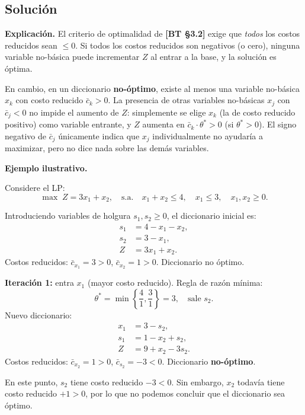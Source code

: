 \documentclass{article}
\begin{document}
\subsection*{Solución}

\textbf{Explicación.}
El criterio de optimalidad de \textbf{[BT §3.2]} exige que \emph{todos} los costos reducidos sean $\leq 0$. Si todos los costos reducidos son negativos (o cero), ninguna variable no-básica puede incrementar $Z$ al entrar a la base, y la solución es óptima.

En cambio, en un diccionario \textbf{no-óptimo}, existe al menos una variable no-básica $x_k$ con costo reducido $\bar{c}_k > 0$. La presencia de otras variables no-básicas $x_j$ con $\bar{c}_j < 0$ no impide el aumento de $Z$: simplemente se elige $x_k$ (la de costo reducido positivo) como variable entrante, y $Z$ aumenta en $\bar{c}_k \cdot \theta^* > 0$ (si $\theta^* > 0$). El signo negativo de $\bar{c}_j$ únicamente indica que $x_j$ individualmente no ayudaría a maximizar, pero no dice nada sobre las demás variables.

\medskip
\textbf{Ejemplo ilustrativo.}

Considere el LP:
\[
  \max\; Z = 3x_1 + x_2, \quad \text{s.a.}\quad x_1 + x_2 \leq 4,\quad x_1 \leq 3,\quad x_1, x_2 \geq 0.
\]

Introduciendo variables de holgura $s_1, s_2 \geq 0$, el diccionario inicial es:
\begin{align*}
  s_1 &= 4 - x_1 - x_2, \\
  s_2 &= 3 - x_1, \\
  Z &= 3x_1 + x_2.
\end{align*}
Costos reducidos: $\bar{c}_{x_1} = 3 > 0$, $\bar{c}_{x_2} = 1 > 0$. Diccionario no óptimo.

\textbf{Iteración 1:} entra $x_1$ (mayor costo reducido). Regla de razón mínima:
\[
  \theta^* = \min\!\left\{\frac{4}{1}, \frac{3}{1}\right\} = 3, \quad \text{sale } s_2.
\]
Nuevo diccionario:
\begin{align*}
  x_1 &= 3 - s_2, \\
  s_1 &= 1 - x_2 + s_2, \\
  Z &= 9 + x_2 - 3s_2.
\end{align*}
Costos reducidos: $\bar{c}_{x_2} = 1 > 0$, $\bar{c}_{s_2} = -3 < 0$. Diccionario \textbf{no-óptimo}.

En este punto, $s_2$ tiene costo reducido $-3 < 0$. Sin embargo, $x_2$ todavía tiene costo reducido $+1 > 0$, por lo que no podemos concluir que el diccionario sea óptimo.
\end{document}
